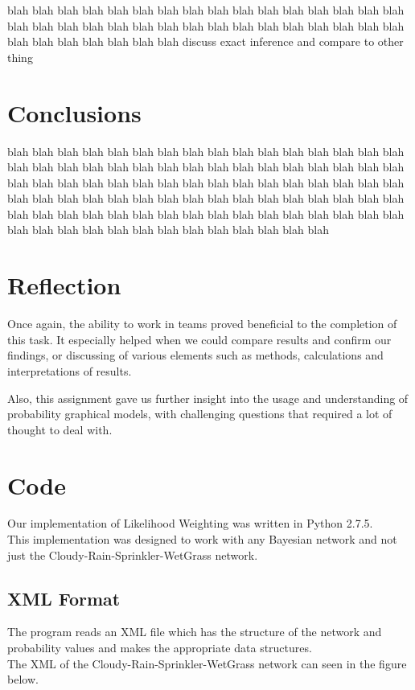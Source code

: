 \documentclass{article}
\begin{document}
blah blah blah blah blah blah blah blah blah blah blah blah blah blah blah blah blah blah blah blah blah blah blah blah blah blah blah blah blah blah blah blah blah blah blah blah blah blah blah discuss exact inference and compare to other thing

\section{Conclusions}
blah blah blah blah blah blah blah blah blah blah blah blah blah blah blah blah blah blah blah blah blah blah blah blah blah blah blah blah blah blah blah blah blah blah blah blah blah blah blah blah blah blah blah blah blah blah blah blah blah blah blah blah blah blah blah blah blah blah blah blah blah blah blah blah blah blah blah blah blah blah blah blah blah blah blah blah blah blah blah blah blah blah blah blah blah blah blah blah blah blah blah blah blah 

\section{Reflection}
Once again, the ability to work in teams proved beneficial to the completion of this task. It especially helped when we could compare results and confirm our findings, or discussing of various elements such as methods, calculations and interpretations of results. 

Also, this assignment gave us further insight into the usage and understanding of probability graphical models, with challenging questions that required a lot of thought to deal with.  
\section{Code}
Our implementation of Likelihood Weighting was written in Python 2.7.5.\\

This implementation was designed to work with any Bayesian network and not just the Cloudy-Rain-Sprinkler-WetGrass network.

\subsection{XML Format}
The program reads an XML file which has the structure of the network and probability values and makes the appropriate data structures.\\

The XML of the Cloudy-Rain-Sprinkler-WetGrass network can seen in the figure below.
\end{document}
